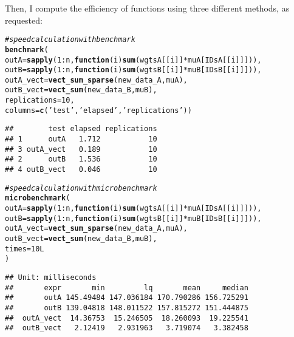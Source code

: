 \documentclass{llncs}\usepackage[]{graphicx}\usepackage[]{color}
\makeatletter
\newcommand{\hlnum}[1]{\textcolor[rgb]{0.686,0.059,0.569}{#1}}%
\newcommand{\hlstr}[1]{\textcolor[rgb]{0.192,0.494,0.8}{#1}}%
\newcommand{\hlcom}[1]{\textcolor[rgb]{0.678,0.584,0.686}{\textit{#1}}}%
\newcommand{\hlopt}[1]{\textcolor[rgb]{0,0,0}{#1}}%
\newcommand{\hlstd}[1]{\textcolor[rgb]{0.345,0.345,0.345}{#1}}%
\newcommand{\hlkwa}[1]{\textcolor[rgb]{0.161,0.373,0.58}{\textbf{#1}}}%
\newcommand{\hlkwc}[1]{\textcolor[rgb]{0.333,0.667,0.333}{#1}}%
\newcommand{\hlkwd}[1]{\textcolor[rgb]{0.737,0.353,0.396}{\textbf{#1}}}%
\newenvironment{kframe}{%
 \def\at@end@of@kframe{}%
 \ifinner\ifhmode%
  \def\at@end@of@kframe{\end{minipage}}%
  \begin{minipage}{\columnwidth}%
 \fi\fi%
 \def\FrameCommand##1{\hskip\@totalleftmargin \hskip-\fboxsep
 \colorbox{shadecolor}{##1}\hskip-\fboxsep
     \hskip-\linewidth \hskip-\@totalleftmargin \hskip\columnwidth}%
 \MakeFramed {\advance\hsize-\width
   \@totalleftmargin\z@ \linewidth\hsize
   \@setminipage}}%
 {\par\unskip\endMakeFramed%
 \at@end@of@kframe}
\newenvironment{knitrout}{}{} %
\makeatother
\begin{document}
\noindent
Then, I compute the efficiency of functions using three different methods, as requested:
\begin{knitrout}
\color{fgcolor}\begin{kframe}
\begin{alltt}
\hlcom{# speed calculation with benchmark}
\hlkwd{benchmark}\hlstd{(}
  \hlkwc{outA} \hlstd{=} \hlkwd{sapply}\hlstd{(}\hlnum{1}\hlopt{:}\hlstd{n,}\hlkwa{function}\hlstd{(}\hlkwc{i}\hlstd{)} \hlkwd{sum}\hlstd{(wgtsA[[i]]}\hlopt{*}\hlstd{muA[IDsA[[i]]])),}
  \hlkwc{outB} \hlstd{=} \hlkwd{sapply}\hlstd{(}\hlnum{1}\hlopt{:}\hlstd{n,}\hlkwa{function}\hlstd{(}\hlkwc{i}\hlstd{)} \hlkwd{sum}\hlstd{(wgtsB[[i]]}\hlopt{*}\hlstd{muB[IDsB[[i]]])),}
  \hlkwc{outA_vect}\hlstd{=}\hlkwd{vect_sum_sparse}\hlstd{(new_data_A,muA),}
  \hlkwc{outB_vect}\hlstd{=}\hlkwd{vect_sum}\hlstd{(new_data_B,muB),}
  \hlkwc{replications} \hlstd{=} \hlnum{10}\hlstd{,}
  \hlkwc{columns}\hlstd{=}\hlkwd{c}\hlstd{(}\hlstr{'test'}\hlstd{,} \hlstr{'elapsed'}\hlstd{,} \hlstr{'replications'}\hlstd{))}
\end{alltt}
\begin{lstlisting}[basicstyle=\ttfamily,breaklines=true]
##        test elapsed replications
## 1      outA   1.712           10
## 3 outA_vect   0.189           10
## 2      outB   1.536           10
## 4 outB_vect   0.046           10
\end{lstlisting}
\begin{alltt}
\hlcom{# speed calculation with microbenchmark}
\hlkwd{microbenchmark}\hlstd{(}
  \hlkwc{outA} \hlstd{=} \hlkwd{sapply}\hlstd{(}\hlnum{1}\hlopt{:}\hlstd{n,}\hlkwa{function}\hlstd{(}\hlkwc{i}\hlstd{)} \hlkwd{sum}\hlstd{(wgtsA[[i]]}\hlopt{*}\hlstd{muA[IDsA[[i]]])),}
  \hlkwc{outB} \hlstd{=} \hlkwd{sapply}\hlstd{(}\hlnum{1}\hlopt{:}\hlstd{n,}\hlkwa{function}\hlstd{(}\hlkwc{i}\hlstd{)} \hlkwd{sum}\hlstd{(wgtsB[[i]]}\hlopt{*}\hlstd{muB[IDsB[[i]]])),}
  \hlkwc{outA_vect}\hlstd{=}\hlkwd{vect_sum_sparse}\hlstd{(new_data_A,muA),}
  \hlkwc{outB_vect}\hlstd{=}\hlkwd{vect_sum}\hlstd{(new_data_B,muB),}
  \hlkwc{times} \hlstd{=} \hlnum{10L}
\hlstd{)}
\end{alltt}
\begin{lstlisting}[basicstyle=\ttfamily,breaklines=true]
## Unit: milliseconds
##       expr       min         lq       mean     median
##       outA 145.49484 147.036184 170.790286 156.725291
##       outB 139.04818 148.011522 157.815272 151.444875
##  outA_vect  14.36753  15.246505  18.260093  19.225541
##  outB_vect   2.12419   2.931963   3.719074   3.382458

\end{lstlisting}
\end{kframe}
\end{knitrout}
\end{document}
